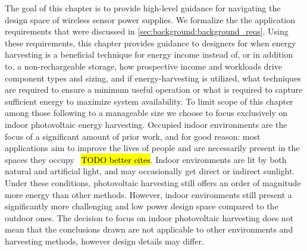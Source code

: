 The goal of this chapter is to provide high-level guidance for navigating the design space of wireless sensor power supplies. 
We formalize the the application requirements that were discussed in 
\cref{sec:background:background_reqs}.
Using these requirements, this chapter provides guidance to designers for when energy harvesting is a beneficial technique for energy income instead of, or in addition to, a non-rechargeable storage, how prospective income and workloads drive component types and sizing, and if energy-harvesting is utilized, what techniques are required to ensure a minimum useful operation or what is required to capture sufficient energy to maximize system availability. 
To limit scope of this chapter among those following to a manageable size we choose to focus exclusively on indoor photovoltaic energy harvesting.
Occupied indoor environments are the focus of a significant
amount of
prior work, 
and for good reason: most
applications aim to improve the lives of people and are necessarily present
in the spaces they occupy~\cite{hesterTimely17,hesterFlicker17,colinReconfigurable18,campbellEnergy14} \hl{TODO better cites}.
Indoor environments are lit by both natural and artificial light, 
and may occasionally get direct or indirect sunlight. 
Under these conditions, photovoltaic harvesting still offers an order of magnitude more energy than other methods.
However, indoor environments still present a significantly more challenging and low power design space compared to the outdoor ones. 
The decision to focus on indoor photovoltaic harvesting does not mean that the conclusions drawn are not applicable to other
environments and harvesting methods, however design details may differ. 

